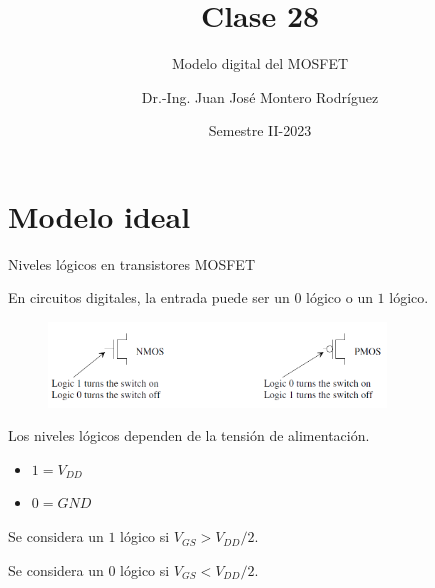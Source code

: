\documentclass[t,aspectratio=169]{beamer}
\title{Clase 28}
\subtitle{Modelo digital del MOSFET}
\author{Dr.-Ing. Juan José Montero Rodríguez}
\institute{Escuela de Ingeniería Electrónica}
\date{Semestre II-2023}
\begin{document}
\begin{frame}{}
\maketitle
\end{frame}


\section{Modelo ideal}
\begin{frame}{Niveles lógicos en transistores MOSFET}

En circuitos digitales, la entrada puede ser un $0$ lógico o un $1$ lógico.

\begin{figure}[H]
    \centering
    \includegraphics[width=0.8\textwidth]{figuras/mosfet_as_a_switch.png}
\end{figure}

Los niveles lógicos dependen de la tensión de alimentación.

\begin{itemize}
    \item $1 = V_{DD}$
    \item $0 = GND$
\end{itemize}

Se considera un $1$ lógico si $V_{GS} > V_{DD}/2$.

Se considera un $0$ lógico si $V_{GS} < V_{DD}/2$.

\end{frame}
\end{document}
